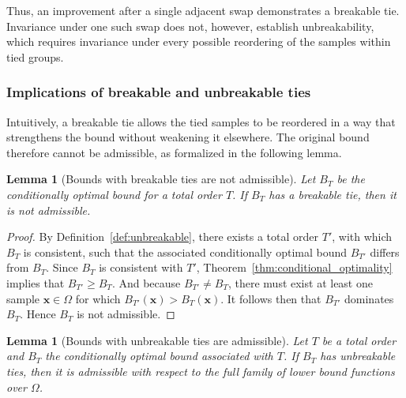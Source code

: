 \documentclass{article}
\newtheorem{lemma}[theorem]{Lemma}
\theoremstyle{definition}
\theoremstyle{remark}
\def\x{\mathbf{x}}
\begin{document}
Thus, an improvement after a single adjacent swap demonstrates a breakable tie. Invariance under one such swap does not, however, establish unbreakability, which requires invariance under every possible reordering of the samples within tied groups.

\subsubsection{Implications of breakable and unbreakable ties}
Intuitively, a breakable tie allows the tied samples to be reordered in a way that strengthens the bound without weakening it elsewhere. The original bound therefore cannot be admissible, as formalized in the following lemma.

\begin{lemma}[Bounds with breakable ties are not admissible]
\label{lem:breakable}
Let $B_T$ be the conditionally optimal bound for a total order $T$. If $B_T$ has a breakable tie, then it is not admissible.
\end{lemma}
\begin{proof}
    By Definition~\ref{def:unbreakable}, there exists a total order $T'$, with which $B_T$ is consistent, such that the associated conditionally optimal bound $B_{T'}$ differs from $B_T$. Since $B_T$ is consistent with $T'$, Theorem~\ref{thm:conditional_optimality} implies that $B_{T'} \geq B_T$. And because $B_{T'} \neq B_T$, there must exist at least one sample $\x \in \Omega$ for which $B_{T'}(\x) > B_T(\x)$. It follows then that $B_{T'}$ dominates $B_T$. Hence $B_T$ is not admissible.
\end{proof}

\begin{lemma}[Bounds with unbreakable ties are admissible]
\label{lem:unbreakable}
    Let $T$ be a total order and $B_T$ the conditionally optimal bound associated with $T$. If $B_T$ has unbreakable ties, then it is admissible with respect to the full family of lower bound functions over $\Omega$.
\end{lemma}
\end{document}
